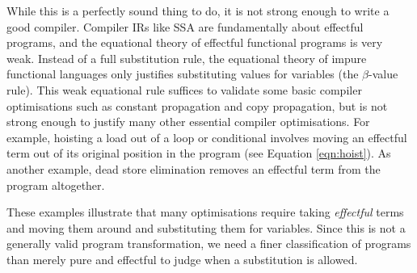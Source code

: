 \documentclass[acmsmall,screen,review]{acmart}
\begin{document}
While this is a perfectly sound thing to do, it is not strong enough to write a
good compiler. Compiler IRs like SSA are fundamentally about effectful programs,
and the equational theory of effectful functional programs is very weak. Instead
of a full substitution rule, the equational theory of impure functional
languages only justifies substituting values for variables (the $\beta$-value
rule). This weak equational rule suffices to validate some basic compiler
optimisations such as constant propagation and copy propagation, but is not
strong enough to justify many other essential compiler optimisations. For
example, hoisting a load out of a loop or conditional involves moving an
effectful term out of its original position in the program (see Equation
\ref{eqn:hoist}). As another example, dead store elimination removes an
effectful term from the program altogether.


These examples illustrate that many optimisations require taking
\emph{effectful} terms and moving them around and substituting them for
variables. Since this is not a generally valid program transformation, we need a
finer classification of programs than merely pure and effectful to judge when a
substitution is allowed.
\end{document}
